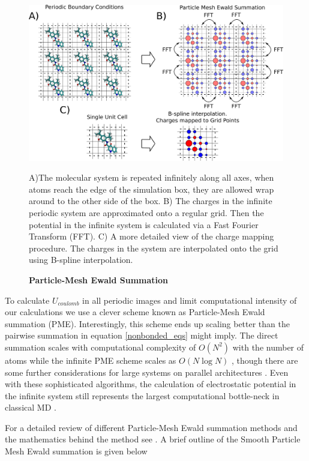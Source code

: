 \begin{figure}
	\begin{center}
		\includegraphics[width=\textwidth]{figures/PME_miro.pdf}
	\end{center}
	\captionsetup{singlelinecheck = false, justification=raggedright}
	\caption[Particle Mesh Ewald Summation] {\textbf{Particle-Mesh Ewald Summation}}{A)The molecular system is repeated infinitely along all axes, when atoms reach the edge of the simulation box, they are allowed wrap around to the other side of the box. B) The charges in the infinite periodic system are approximated onto a regular grid. Then the potential in the infinite system is calculated via a Fast Fourier Transform (FFT). C) A more detailed view of the charge mapping procedure. The charges in the system are interpolated onto the grid using B-spline interpolation. }
	\label{PME_illustration}
\end{figure}

To calculate $U_{coulomb}$ in all periodic images and limit computational intensity of our calculations we use a clever scheme known as Particle-Mesh Ewald summation (PME). Interestingly, this scheme ends up scaling better than the pairwise summation in equation \ref{nonbonded_eqs} might imply. The direct summation scales with computational complexity of $O(N^2)$  with the number of atoms while the infinite PME scheme scales as $O (N\log N)$ \cite{darden1993}, though there are some further considerations for large systems on parallel architectures \cite{hardy2015}. Even with these sophisticated algorithms, the calculation of electrostatic potential in the infinite system still represents the largest computational bottle-neck in classical MD \cite{hardy2015}.

For a detailed review of different Particle-Mesh Ewald summation methods and the mathematics behind the method see \cite{shan2005}. A brief outline of the Smooth Particle Mesh Ewald summation is given below 

